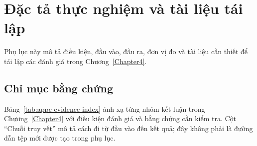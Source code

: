 \appendix
\setcounter{chapter}{2}
\chapter{Đặc tả thực nghiệm và tài liệu tái lập}
\label{AppendixC}

Phụ lục này mô tả điều kiện, đầu vào, đầu ra, đơn vị đo và tài liệu cần thiết để tái lập các đánh giá trong Chương~\ref{Chapter4}.

\section{Chỉ mục bằng chứng}
\label{appc:index}

Bảng~\ref{tab:appc-evidence-index} ánh xạ từng nhóm kết luận trong Chương~\ref{Chapter4} với điều kiện đánh giá và bằng chứng cần kiểm tra. Cột ``Chuỗi truy vết'' mô tả cách đi từ đầu vào đến kết quả; đây không phải là đường dẫn tệp mới được tạo trong phụ lục.

